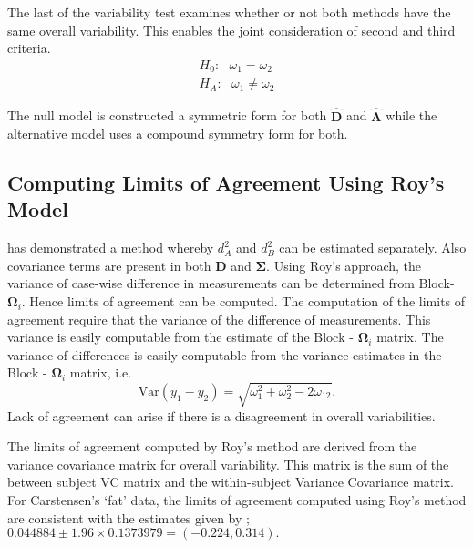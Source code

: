 \documentclass[12pt, a4paper]{report}
\theoremstyle{plain}
\theoremstyle{definition}
\theoremstyle{remark}
\begin{document}
	The last of the variability test examines whether or not both methods have the same overall variability. This enables the joint consideration of second and third criteria.
	\begin{eqnarray*}
		H_{0}: \mbox{ }\omega_{1}  = \omega_{2} \\
		H_{A}: \mbox{ }\omega_{1}  \neq \omega_{2}
	\end{eqnarray*}
	
	The null model is constructed a symmetric form for both $\boldsymbol{\hat{D}}$ and $\boldsymbol{\hat{\Lambda}}$ while the alternative model uses a compound symmetry form for both.
	

 
 
 
\subsection{Computing Limits of Agreement Using Roy's Model}
\citet{ARoy2009} has demonstrated a method whereby $d^2_{A}$ and $d^2_{B}$ can be estimated separately. Also covariance terms are present in both $\boldsymbol{D}$ and $\boldsymbol{\Sigma}$. Using Roy's approach, the variance of case-wise difference in measurements can be determined from Block-$\boldsymbol{\Omega}_{i}$. Hence limits of agreement can be computed. The computation of the limits of agreement require that the variance of the difference of measurements. This variance is easily computable from the estimate of the ${\mbox{Block - }\boldsymbol \Omega_{i}}$ matrix.
The variance of differences is easily computable from the variance estimates in the ${\mbox{Block - }\boldsymbol \Omega_{i}}$ matrix, i.e.
\[
\mathrm{Var}(y_1 - y_2) = \sqrt{ \omega^2_1 + \omega^2_2 - 2\omega_{12}}.
\]	
Lack of agreement can arise if there is a disagreement in overall variabilities. 

The limits of agreement computed by Roy's method are derived from the variance covariance matrix for overall variability.
This matrix is the sum of the between subject VC matrix and the within-subject Variance Covariance matrix.
For Carstensen's `fat' data, the limits of agreement computed using Roy's
method are consistent with the estimates given by \citet{BXC2008}; $0.044884  \pm 1.96 \times  0.1373979 = (-0.224,  0.314).$




\end{document}
